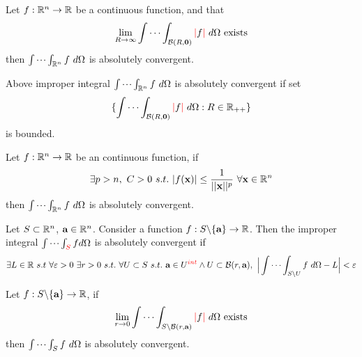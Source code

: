 \documentclass[11pt]{article}
\begin{document}
				\begin{theorem}
					Let $f: \mathbb{R}^n \to \mathbb{R}$ be a continuous function, and that 
					\begin{equation}
						\lim_{R \to \infty} \idotsint_{\mathcal{{B}}(R, \textbf{0})}\textcolor{red}{|}f\textcolor{red}{|}\ d\Omega \text{{ exists}}
					\end{equation}
					then $\idotsint_{\R^n}f\ d\Omega$ is absolutely convergent.
				\end{theorem}
				
				\begin{corollary}[Equivalence]
					Above improper integral $\idotsint_{\R^n}f\ d\Omega$ is absolutely convergent if set
					\begin{equation}
						\{\idotsint_{\mc{B}(R, \ve{0})}\red{|}f\red{|}\ d\Omega: R \in \R_{++}\}
					\end{equation}
					is bounded.
				\end{corollary}
				
				\begin{corollary}
					Let $f: \mathbb{R}^n \to \mathbb{R}$ be an continuous function, if 
					\begin{equation}
						\exists p > n,\ C > 0\ s.t.\ |f(\ve{x})| \leq \frac{1}{\norm{\ve{x}}^p}\ \forall \ve{x} \in \R^n
					\end{equation}
					then $\idotsint_{\R^n}f\ d\Omega$ is absolutely convergent.
				\end{corollary}
	
				\begin{definition}
					Let $S \subset \mathbb{R}^n$, $\textbf{a} \in \mathbb{R}^n$. Consider a function $f: S \backslash \{\textbf{a}\} \to \mathbb{R}$. Then the improper integral $\idotsint_{\textcolor{red}{S}}f d\Omega$ is absolutely convergent if 
					\begin{equation}
						\exists L \in \mathbb{R}\ s.t\ \forall \varepsilon > 0\ \exists r > 0\ s.t.\ \forall U \subset S\ s.t.\ \textbf{a} \in U^{\textcolor{red}{int}} \land U \subset \mathcal{{B}}(r, \textbf{a}),\ \Big|
							\idotsint_{S \backslash U}f\ d\Omega - L
						\Big| < \varepsilon
					\end{equation}
				\end{definition}
				
				\begin{theorem}
					Let $f: S\backslash \{\textbf{a}\} \to \mathbb{R}$, if
					\begin{equation}
						\lim_{r\to 0}\idotsint_{S \backslash \mathcal{{B}}(r, \textbf{a})}\textcolor{red}{|}f\textcolor{red}{|}\ d\Omega \text{{ exists}}
					\end{equation}
					then $\idotsint_S f\ d\Omega$ is absolutely convergent.
				\end{theorem}
				
\end{document}
